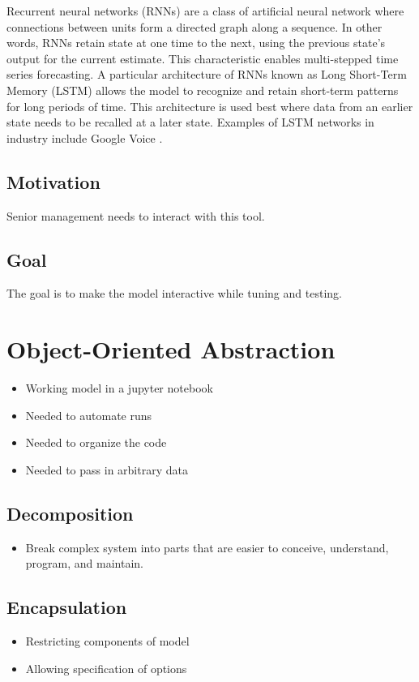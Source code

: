 \documentclass[11pt, oneside]{article}
\begin{document}
Recurrent neural networks (RNNs) are a class of artificial neural network where connections between units form a directed graph along a sequence. In other words, RNNs retain state at one time to the next, using the previous state's output for the current estimate. This characteristic enables multi-stepped time series forecasting. A particular architecture of RNNs known as Long Short-Term Memory (LSTM) allows the model to recognize and retain short-term patterns for long periods of time. This architecture is used best where data from an earlier state needs to be recalled at a later state. Examples of LSTM networks in industry include Google Voice \cite{beaufays}.

\subsection{Motivation}
Senior management needs to interact with this tool.

\subsection{Goal}
The goal is to make the model interactive while tuning and testing.

\section{Object-Oriented Abstraction}
  \begin{itemize}
    \item{Working model in a jupyter notebook}
    \item{Needed to automate runs}
    \item{Needed to organize the code}
    \item{Needed to pass in arbitrary data}
  \end{itemize}

\subsection{Decomposition}
  \begin{itemize}
    \item{Break complex system into parts that are easier to conceive, understand, program, and maintain.}
  \end{itemize}
\subsection{Encapsulation}
  \begin{itemize}
    \item{Restricting components of model}
    \item{Allowing specification of options}
  \end{itemize}
\end{document}
